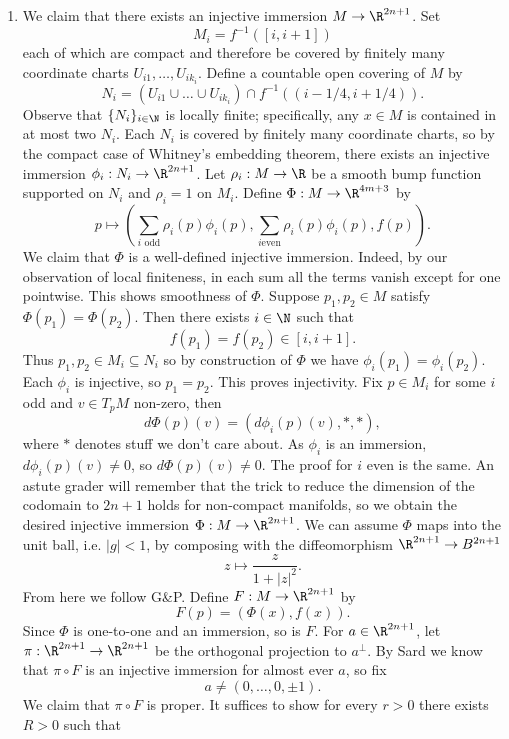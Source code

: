 \documentclass[reqno]{amsart}
\theoremstyle{definition}
\theoremstyle{remark}
\begin{document}
\begin{enumerate}
	\item We claim that there exists an injective immersion $M \to \R^{2n + 1}$. Set
			\[ M_i = f^{-1} ([i, i + 1]) \]
		each of which are compact and therefore be covered by finitely many coordinate charts $U_{i1}, \dots, U_{ik_i}$. Define a countable open covering of $M$ by 
			\[ N_i = (U_{i1} \cup \dots \cup U_{ik_i}) \cap f^{-1} ((i - 1/4, i + 1/4)). \]
		Observe that $\{N_i\}_{i \in \N}$ is locally finite; specifically, any $x \in M$ is contained in at most two $N_i$. Each $N_i$ is covered by finitely many coordinate charts, so by the compact case of Whitney's embedding theorem, there exists an injective immersion $\phi_i : N_i \to \R^{2n + 1}$. Let $\rho_i : M \to \R$ be a smooth bump function supported on $N_i$ and $\rho_i = 1$ on $M_i$. Define $\Phi: M \to \R^{4m + 3}$ by 
			\[ p \mapsto \left( \sum_{i \text{ odd}} \rho_i (p) \phi_i (p), \sum_{i \text{even}} \rho_i (p) \phi_i (p), f(p) \right). \]
		We claim that $\Phi$ is a well-defined injective immersion. Indeed, by our observation of local finiteness, in each sum all the terms vanish except for one pointwise. This shows smoothness of $\Phi$. Suppose $p_1, p_2 \in M$ satisfy $\Phi(p_1) = \Phi(p_2)$. Then there exists $i \in \N$ such that
			\[ f(p_1) = f(p_2) \in [i, i + 1]. \]
		Thus $p_1, p_2 \in M_i \subseteq N_i$ so by construction of $\Phi$ we have $\phi_i (p_1) = \phi_i (p_2)$. Each $\phi_i$ is injective, so $p_1 = p_2$. This proves injectivity. Fix $p \in M_i$ for some $i$ odd and $v \in T_p M$ non-zero, then 
			\[ d\Phi(p)(v) = (d\phi_i (p)(v), *, *), \]
		where $*$ denotes stuff we don't care about. As $\phi_i$ is an immersion, $d\phi_i (p)(v) \neq 0$, so $d\Phi(p)(v) \neq 0$. The proof for $i$ even is the same. An astute grader will remember that the trick to reduce the dimension of the codomain to $2n + 1$ holds for non-compact manifolds, so we obtain the desired injective immersion $\Phi: M \to \R^{2n + 1}$. We can assume $\Phi$ maps into the unit ball, i.e. $|g| < 1$, by composing with the diffeomorphism $\R^{2n + 1} \to B^{2n + 1}$
			\[ z \mapsto \frac{z}{1 + |z|^2}. \]
		From here we follow G\&P. Define $F: M \to \R^{2n + 1}$ by 
			\[ F(p) = (\Phi(x), f(x)). \]
		Since $\Phi$ is one-to-one and an immersion, so is $F$. For $a \in \R^{2n + 1}$, let $\pi: \R^{2n +1} \to \R^{2n + 1}$ be the orthogonal projection to $a^\perp$. By Sard we know that $\pi \circ F$ is an injective immersion for almost ever $a$, so fix 
			\[ a \neq (0, \dots, 0, \pm 1).\]
		We claim that $\pi \circ F$ is proper. It suffices to show for every $r > 0$ there exists $R > 0$ such that

\end{enumerate}
\end{document}
